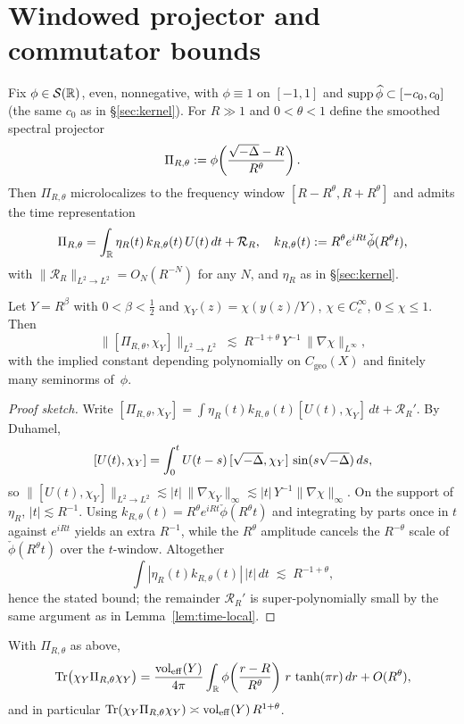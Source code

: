 \section{Windowed projector and commutator bounds}\label{sec:proj-comm}

Fix $\phi\in\mathcal{S}(\mathbb{R})$, even, nonnegative, with $\phi\equiv1$ on $[-1,1]$ and $\operatorname{supp} \widehat{\phi}\subset[-c_0,c_0]$ (the same $c_0$ as in \S\ref{sec:kernel}). For $R\gg1$ and $0<\theta<1$ define the smoothed spectral projector
\[
\Pi_{R,\theta}:=\phi\!\left(\frac{\sqrt{-\Delta}-R}{R^\theta}\right).
\]
Then $\Pi_{R,\theta}$ microlocalizes to the frequency window $[R-R^\theta,R+R^\theta]$ and admits the time representation
\[
\Pi_{R,\theta}=\int_{\mathbb{R}}\eta_R(t)\, k_{R,\theta}(t)\, U(t)\,dt + \mathcal{R}_R,
\quad
k_{R,\theta}(t):=R^\theta e^{iRt}\check{\phi}(R^\theta t),
\]
with $\|\mathcal{R}_R\|_{L^2\to L^2}=O_N(R^{-N})$ for any $N$, and $\eta_R$ as in \S\ref{sec:kernel}.

\begin{lemma}\label{lem:comm}
Let $Y=R^\beta$ with $0<\beta<\tfrac12$ and $\chi_Y(z)=\chi(y(z)/Y)$, $\chi\in C_c^\infty$, $0\le \chi\le1$. Then
\[
\big\|[\Pi_{R,\theta},\chi_Y]\big\|_{L^2\to L^2}
\;\lesssim\; R^{-1+\theta}\,Y^{-1}\,\|\nabla\chi\|_{L^\infty},
\]
with the implied constant depending polynomially on $C_{\mathrm{geo}}(X)$ and finitely many seminorms of~$\phi$.
\end{lemma}

\begin{proof}[Proof sketch]
Write $[\Pi_{R,\theta},\chi_Y]=\int \eta_R(t)k_{R,\theta}(t)[U(t),\chi_Y]\,dt+\mathcal{R}_R'$. By Duhamel,
\[
[U(t),\chi_Y]=\int_0^t U(t-s)\,[\sqrt{-\Delta},\chi_Y]\,\sin(s\sqrt{-\Delta})\,ds,
\]
so $\|[U(t),\chi_Y]\|_{L^2\to L^2}\lesssim |t|\,\|\nabla\chi_Y\|_\infty \lesssim |t|\,Y^{-1}\|\nabla\chi\|_\infty$.
On the support of $\eta_R$, $|t|\lesssim R^{-1}$. Using $k_{R,\theta}(t)=R^\theta e^{iRt}\check\phi(R^\theta t)$ and integrating by parts once in $t$ against $e^{iRt}$ yields an extra $R^{-1}$, while the $R^\theta$ amplitude cancels the $R^{-\theta}$ scale of $\check\phi(R^\theta t)$ over the $t$-window. Altogether
\[
\int | \eta_R(t) k_{R,\theta}(t)|\,|t|\,dt \;\lesssim\; R^{-1+\theta},
\]
hence the stated bound; the remainder $\mathcal{R}_R'$ is super-polynomially small by the same argument as in Lemma~\ref{lem:time-local}.
\end{proof}

\begin{lemma}\label{lem:rank}
With $\Pi_{R,\theta}$ as above,
\[
\mathrm{Tr}\big(\chi_Y \Pi_{R,\theta}\chi_Y\big)
= \frac{\operatorname{vol}_{\mathrm{eff}}(Y)}{4\pi}\int_{\mathbb{R}}\phi\!\left(\frac{r-R}{R^\theta}\right)\, r\,\tanh(\pi r)\,dr + O(R^{\theta}),
\]
and in particular $\mathrm{Tr}(\chi_Y \Pi_{R,\theta}\chi_Y) \asymp \operatorname{vol}_{\mathrm{eff}}(Y)\,R^{1+\theta}$.
\end{lemma}

